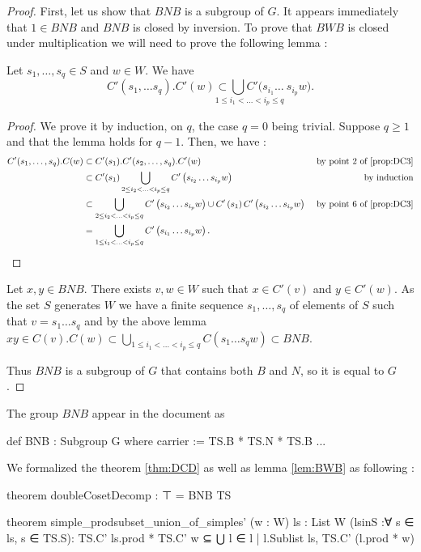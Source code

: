 \begin{proof}
    First, let us show that $BNB$ is a subgroup of $G$. It appears immediately that $1 \in BNB$ and $BNB $ is closed by inversion. To prove that $BWB$ is closed under multiplication we will need to prove the following lemma : 
\begin{lemme} \label{lem:BWB}
    Let $s_1, \ldots,s_q \in S$ and $w \in W$. We have
    \[
        C'\left( s_1,\ldots s_q \right). C'(w) \underset{1\le i_1 < ... < i_p \le q}{\subset \bigcup C' ( s_{i_1}\ldots }\ s_{i_p} w )
    .\] 
\end{lemme} 
\begin{proof}
    We prove it by induction, on $q$, the case $q=0$ being trivial. Suppose $q \ge 1 $ and that the lemma holds for $q -1$. Then, we have :
    \begin{align*}
        C'(s_1,\ldots,s_q). C(w) &\subset C'(s_1).C'(s_2,\ldots,s_q).C'(w) &\text{ by point 2 of \ref{prop:DC3}}\\
                                 &\subset C'(s_1) \bigcup_{2\le i_2 < ... < i_p \le q} C'\left( s_{i_2}\ldots s_{i_p} w \right)& \text{ by induction}\\
                                 & \subset \bigcup_{2\le i_2 < ... < i_p \le q} C'\left( s_{i_2}\ldots s_{i_p} w \right) \cup C'\left( s_1 \right)C'\left( s_{i_2}\ldots s_{i_p} w \right) & \text{ by point 6 of \ref{prop:DC3}}\\
                                 &= \bigcup_{1\le i_1 < ... < i_p \le q} C'\left( s_{i_1}\ldots s_{i_p} w \right)
    .\end{align*}
\end{proof}


Let $x,y \in BNB$. There exists $v,w \in W$ such that $x \in C'(v)$ and $y \in C'(w)$. As the set $S$ generates $W$ we have a finite sequence $s_1,\ldots,s_q$ of elements of $S$ such that $v = s_1 \ldots s_q$ and by the above lemma $xy \in C(v).C(w) \subset \bigcup_{1 \le i_1 < ... < i_p \le q} C(s_1\ldots s_q w) \subset BNB$.

Thus $BNB$ is a subgroup of $G$ that contains both $B$ and $N$, so it is equal to $G$.
\end{proof}

The group $BNB$ appear in the document  as 
\begin{leancode}
def BNB : Subgroup G where
  carrier := TS.B *  TS.N * TS.B
  ...
\end{leancode}

We formalized the theorem \ref{thm:DCD} as well as lemma \ref{lem:BWB} as  following :
\begin{leancode}
theorem doubleCosetDecomp : ⊤ = BNB TS

theorem simple_prodsubset_union_of_simples' (w : W) {ls : List W} 
 (lsinS :∀ s ∈ ls, s ∈ TS.S): 
  TS.C' ls.prod * TS.C' w ⊆ ⋃ l ∈ { l | l.Sublist ls}, TS.C' (l.prod * w)
\end{leancode}

